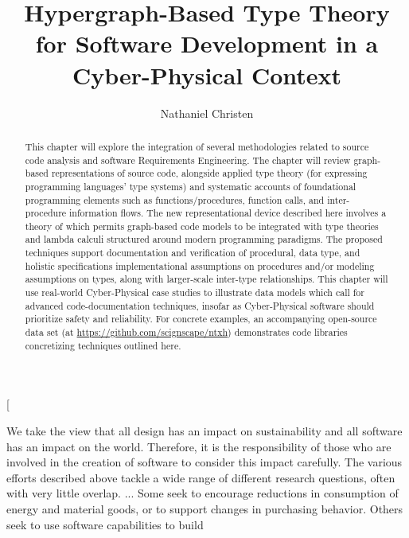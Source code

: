 \documentclass[11pt,twocolumn]{article}
\begin{document}
\title{Hypergraph-Based Type Theory 
{\gapped} for Software Development in a Cyber-Physical Context}
\author[1]{Nathaniel Christen}
\twocolumn[\begin{@twocolumnfalse}
\maketitle{}
\begin{abstract}This chapter will explore the integration of several methodologies 
related to source code analysis and software Requirements 
Engineering.  The chapter will review 
graph-based representations of source code, 
alongside applied type theory (for expressing 
programming languages' type systems) and 
systematic accounts of foundational programming 
elements such as functions/procedures, function calls, and 
inter-procedure information flows.  The new 
representational device described here involves a theory 
of  which permits  
graph-based code models to be integrated with type theories 
and lambda calculi structured around modern 
programming paradigms.   
The proposed techniques support documentation and 
verification of procedural, data type, and holistic 
specifications \mdash{} implementational assumptions on procedures  
and/or modeling assumptions on types, along with 
larger-scale inter-type relationships.  
This chapter will use real-world Cyber-Physical case studies 
to illustrate data models which call for advanced 
code-documentation techniques, insofar as Cyber-Physical 
software should prioritize safety and reliability.    
For concrete examples, an accompanying open-source data set (at
\url{https://github.com/scignscape/ntxh}) 
demonstrates code libraries concretizing 
techniques outlined here.
\end{abstract} 
\newsavebox{\qboxi}
\begin{lrbox}{\qboxi}
\begin{frquote}
{\sadded}We take the view that all design has an impact on sustainability and all software has an impact on the world. Therefore, it is the responsibility of those who are involved in the creation of software to consider this impact carefully.  The various efforts described above tackle a wide range of different research questions, often with very little overlap. ... {\eadded}
Some seek to encourage reductions in consumption of energy
and  material  goods,  or  to  support  changes  in  purchasing
behavior.  Others  seek  to  use  software  capabilities  to  build

\end{frquote}
\end{lrbox}
\end{@twocolumnfalse}
\end{document}

